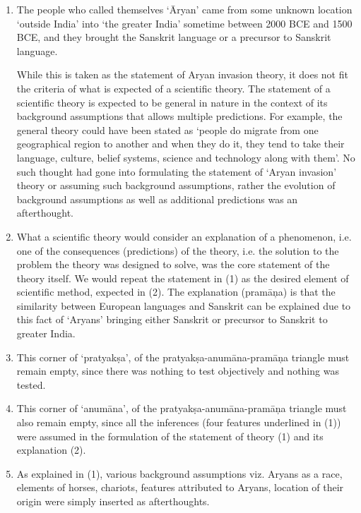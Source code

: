 \begin{enumerate}[{\rm 1)}]
\itemsep=0pt
\item The people who called themselves ‘Āryan’ came from some unknown location ‘outside India’ into ‘the greater India’ sometime between 2000 BCE and 1500 BCE, and they brought the Sanskrit language or a precursor to Sanskrit language.

 While this is taken as the statement of Aryan invasion theory, it does not fit the criteria of what is expected of a scientific theory. The statement of a scientific theory is expected to be general in nature in the context of its background assumptions that allows multiple predictions. For example, the general theory could have been stated as ‘people do migrate from one geographical region to another and when they do it, they tend to take their language, culture, belief systems, science and technology along with them’. No such thought had gone into formulating the statement of ‘Aryan invasion’ theory or assuming such background assumptions, rather the evolution of background assumptions as well as additional predictions was an afterthought.

 \item What a scientific theory would consider an explanation of a phenomenon, i.e. one of the consequences (predictions) of the theory, i.e. the solution to the problem the theory was designed to solve, was the core statement of the theory itself. We would repeat the statement in (1) as the desired element of scientific method, expected in (2). The explanation (pramāņa) is that the similarity between European languages and Sanskrit can be explained due to this fact of ‘Aryans’ bringing either Sanskrit or precursor to Sanskrit to greater India.

 \item This corner of ‘pratyakṣa’, of the pratyakṣa-anumāna-pramāņa triangle must remain empty, since there was nothing to test objectively and nothing was tested.

 \item This corner of ‘anumāna’, of the pratyakṣa-anumāna-pramāņa triangle must also remain empty, since all the inferences (four features underlined in (1)) were assumed in the formulation of the statement of theory (1) and its explanation (2).

 \item As explained in (1), various background assumptions viz. Aryans as a race, elements of horses, chariots, features attributed to Aryans, location of their origin were simply inserted as afterthoughts.

\end{enumerate}


